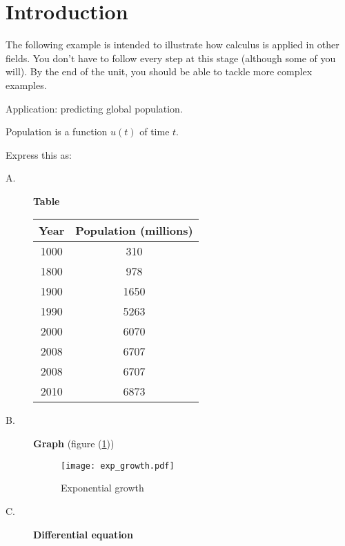 \section*{Introduction} 

The following example is intended to illustrate how calculus is applied in other fields.  You don't have to follow every step at this stage (although some of you will).  By the end of the unit, you should be able to tackle more complex examples.

\begin{example}

Application: predicting global population.

Population is a function $u(t)$ of time $t$.

Express this as:
 \begin{description}
\item[A.] \textbf{Table}

\begin{center}
\begin{tabular}{| c | c |}
\hline
Year & Population (millions)\\
\hline
1000 & 310 \\
\hline 1800 & 978 \\
\hline 1900 & 1650 \\
\hline 1990 & 5263 \\
\hline 2000 & 6070 \\
\hline 2008 & 6707\\
\hline 2008 & 6707 \\
\hline 2010 & 6873 \\
\hline
\end{tabular}
\end{center}


\item[B.] \textbf{Graph} (figure (\ref{expgrowth}))

\begin{figure}[!hbtp]
\centering
\texttt{[image: exp\_growth.pdf]}
\caption{Exponential growth}
\label{expgrowth}
\end{figure}

\newpage

\item[C.] \textbf{Differential equation}



\end{description}
\end{example}
